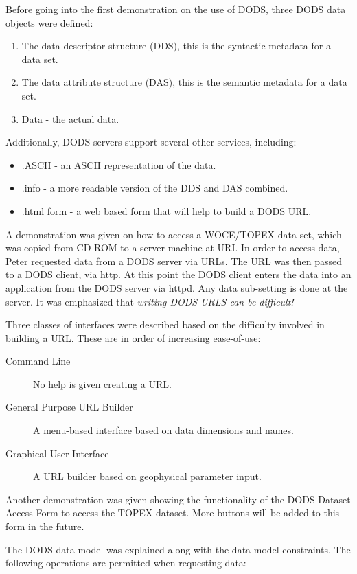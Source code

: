 Before going into the first demonstration on the use of DODS, three
DODS data objects were defined:

\begin{enumerate}
\item The data descriptor structure (DDS), this is the syntactic
  metadata for a data set.
\item The data attribute structure (DAS), this is the semantic
  metadata for a data set.
\item Data - the actual data.
\end{enumerate}

Additionally, DODS servers support several other services, including:
\begin{itemize}
\item .ASCII - an ASCII representation of the data.
\item .info - a more readable version of the DDS and DAS combined.
\item .html form - a web based form that will help to build a DODS URL.
\end{itemize}

A demonstration was given on how to access a WOCE/TOPEX data set,
which was copied from CD-ROM to a server machine at URI.  In order to
access data, Peter requested data from a DODS server via URLs.  The
URL was then passed to a DODS client, via http.  At this point the
DODS client enters the data into an application from the DODS server
via httpd.  Any data sub-setting is done at the server.  It was
emphasized that \emph{writing DODS URLS can be difficult!}

Three classes of interfaces were described based on the difficulty
involved in building a URL.  These are in order of increasing
ease-of-use:

\begin{description}
\item[Command Line] No help is given creating a URL.
\item[General Purpose URL Builder] A menu-based interface based on
  data dimensions and names.
\item[Graphical User Interface] A URL builder based on geophysical
  parameter input.
\end{description}

Another demonstration was given showing the functionality of the DODS
Dataset Access Form to access the TOPEX dataset.  More buttons will be
added to this form in the future.

The DODS data model was explained along with the data model
constraints.  The following operations are permitted when requesting
data:

